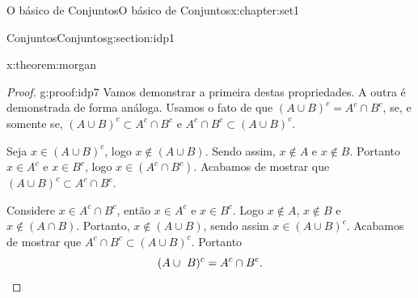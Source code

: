 \documentclass[oneside,10pt,]{book}
\newcommand{\qedhere}{\relax}
\numberwithin{equation}{section}
\begin{document}
\begin{chapterptx}{O básico de Conjuntos}{}{O básico de Conjuntos}{}{}{x:chapter:set1}
\begin{sectionptx}{Conjuntos}{}{Conjuntos}{}{}{g:section:idp1}
\begin{theorem}{}{}{x:theorem:morgan}
%
\end{theorem}
\begin{proof}{}{g:proof:idp7}
Vamos demonstrar a primeira destas propriedades. A outra é demonstrada de forma análoga. Usamos o fato de que \((A \cup B)^c=A^c \cap B^c\), se, e somente se,  \((A \cup B)^c \subset A^c \cap B^c\) e \(A^c \cap B^c \subset (A \cup B)^c\).%
\par
Seja \(x \in (A \cup B)^c\), logo \(x \notin (A \cup B)\). Sendo assim, \(x \notin A\)  e  \(x \notin B\). Portanto \(x \in A^c\)  e  \(x \in B^c\), logo \(x \in (A^c \cap B^c)\). Acabamos de mostrar que \((A \cup B)^c \subset A^c \cap B^c\).%
\par
Considere \(x \in A^c \cap B^c\), então \(x \in A^c\)  e \(x \in B^c\). Logo \(x \notin A\), \(x \notin B\)  e \(x \notin (A\cap B)\). Portanto, \(x \notin (A \cup B)\), sendo assim \(x \in (A \cup B)^c\). Acabamos de mostrar que \(A^c \cap B^c \subset  (A \cup B)^c\). Portanto%
%
\begin{equation*}
(A \cup \ B)^c=A^c \cap B^c.\qedhere
\end{equation*}
\end{proof}
\end{sectionptx}
\end{chapterptx}
%
%
\typeout{************************************************}
\typeout{************************************************}
%
\end{document}
